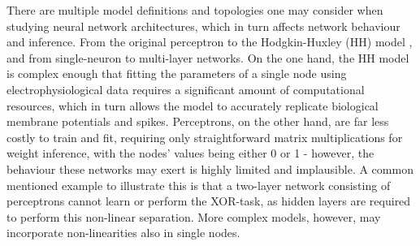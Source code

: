 \documentclass[mphil,deptreport,ianc]{infthesis} %
\begin{document}
There are multiple model definitions and topologies one may consider when studying neural network architectures, which in turn affects network behaviour and inference.
From the original perceptron \cite{Rosenblatt1956} to the Hodgkin-Huxley (HH) model \cite{HH1952}, and from single-neuron to multi-layer networks.
On the one hand, the HH model is complex enough that fitting the parameters of a single node using electrophysiological data requires a significant amount of computational resources, which in turn allows the model to accurately replicate biological membrane potentials and spikes.
Perceptrons, on the other hand, are far less costly to train and fit, requiring only straightforward matrix multiplications for weight inference, with the nodes' values being either 0 or 1 - however, the behaviour these networks may exert is highly limited and implausible.
A common mentioned example to illustrate this is that a two-layer network consisting of perceptrons cannot learn or perform the XOR-task, as hidden layers are required to perform this non-linear separation.
More complex models, however, may incorporate non-linearities also in single nodes.

\end{document}

